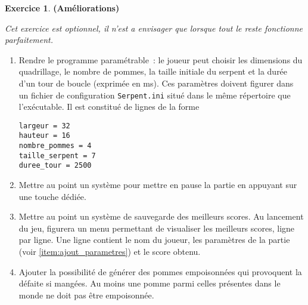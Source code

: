 \documentclass[12pt]{article}
\theoremstyle{definition}
\newtheorem{Exercice}{Exercice}
\begin{document}
\begin{Exercice} {\bf (Améliorations)}\smallskip

{\it Cet exercice est optionnel, il n'est a envisager que lorsque
tout le reste fonctionne parfaitement.}
\smallskip

\begin{enumerate}
    \item \label{item:ajout_parametres}
    Rendre le programme paramétrable~: le joueur peut choisir
    les dimensions du quadrillage, le nombre de pommes, la taille
    initiale du serpent et la durée d'un tour de boucle (exprimée
    en ms). Ces paramètres doivent figurer dans un fichier de configuration
    {\tt Serpent.ini} situé dans le même répertoire que l'exécutable.
    Il est constitué de lignes de la forme
\begin{small}
\begin{verbatim}
largeur = 32
hauteur = 16
nombre_pommes = 4
taille_serpent = 7
duree_tour = 2500
\end{verbatim}
\end{small}
    \smallskip

    \item Mettre au point un système pour mettre en pause la partie
    en appuyant sur une touche dédiée.
    \smallskip

    \item Mettre au point un système de sauvegarde des meilleurs scores.
    Au lancement du jeu, figurera un menu permettant de visualiser
    les meilleurs scores, ligne par ligne. Une ligne contient le nom
    du joueur, les paramètres de la partie (voir \ref{item:ajout_parametres})
    et le score obtenu.
    \smallskip

    \item Ajouter la possibilité de générer des pommes empoisonnées
    qui provoquent la défaite si mangées. Au moins une pomme parmi
    celles présentes dans le monde ne doit pas être empoisonnée.
\end{enumerate}

\end{Exercice}
\bigskip
\end{document}
